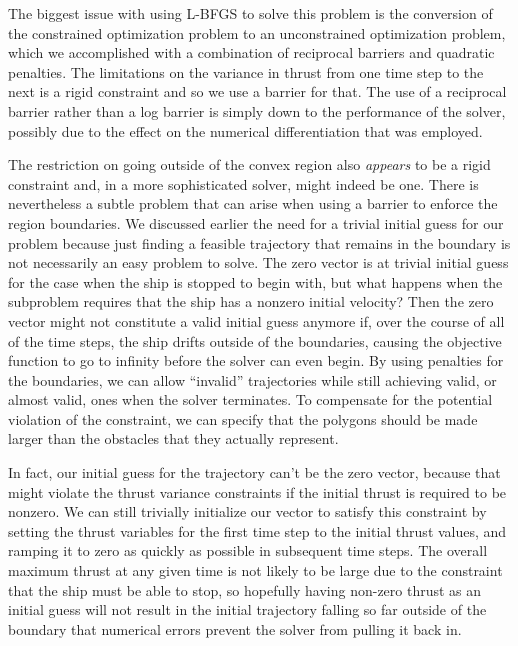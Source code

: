 \documentclass{report}
\begin{document}
The biggest issue with using L-BFGS to solve this problem is the conversion of the constrained optimization problem
to an unconstrained optimization problem, which we accomplished with a combination of reciprocal barriers
and quadratic penalties. The limitations on the variance in thrust from one time step to the next is a rigid constraint
and so we use a barrier for that. The use of a reciprocal barrier rather than a log barrier is simply down to the
performance of the solver, possibly due to the effect on the numerical differentiation that was employed.

The restriction on going outside of the convex region also \emph{appears} to be a rigid constraint and, in a more
sophisticated solver, might indeed be one. There is nevertheless a subtle problem that can arise when using a barrier
to enforce the region boundaries. We discussed earlier the need for a trivial initial guess for our problem because
just finding a feasible trajectory that remains in the boundary is not necessarily an easy problem to solve. The
zero vector is at trivial initial guess for the case when the ship is stopped to begin with, but what happens when
the subproblem requires that the ship has a nonzero initial velocity? Then the zero vector might not constitute a 
valid initial guess anymore if, over the course of all of the time steps, the ship drifts outside of the boundaries,
causing the objective function to go to infinity before the solver can even begin. By using penalties for the boundaries,
we can allow ``invalid'' trajectories while still achieving valid, or almost valid, ones when the solver terminates.
To compensate for the potential violation of the constraint, we can specify that the polygons should be made larger
than the obstacles that they actually represent.

In fact, our initial guess for the trajectory can't be the zero vector, because that might violate the thrust variance
constraints if the initial thrust is required to be nonzero. We can still trivially initialize our vector to 
satisfy this constraint by setting the thrust variables for the first time step to the initial thrust values, and ramping it
to zero as quickly as possible in subsequent time steps.
The overall maximum thrust at any given time is not likely to be large due
to the constraint that the ship must be able to stop,
so hopefully having non-zero thrust as an initial guess will not result in the initial trajectory falling so far
outside of the boundary that numerical errors prevent the solver from pulling it back in.
\end{document}
